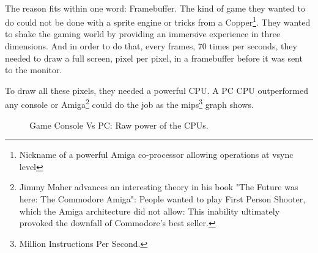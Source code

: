 \\
The reason fits within one word: Framebuffer. The kind of game they wanted to do could not be done with a sprite engine or tricks from a Copper\footnote{Nickname of a powerful Amiga co-processor allowing operations at vsync level}. They wanted to shake the gaming world by providing an immersive experience in three dimensions. And in order to do that, every frames, 70 times per seconds, they needed to draw a full screen, pixel per pixel, in a framebuffer before it was sent to the monitor. \\
\par
To draw all these pixels, they needed a powerful CPU. A PC CPU outperformed any console or Amiga\footnote{Jimmy Maher advances an interesting theory in his book "The Future was here: The Commodore Amiga": People wanted to play First Person Shooter, which the Amiga architecture did not allow: This inability ultimately provoked the downfall of Commodore's best seller.} could do the job as the mips\footnote{Million Instructions Per Second.} graph shows.
\par
\begin{figure}[H]
\centering
   \caption{Game Console Vs PC: Raw power of the CPUs.} \label{fig:game_console_vs_PC}
 \end{figure}
 
